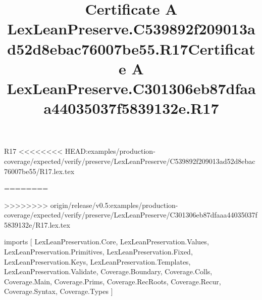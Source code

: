 \begin{lexlean}{R17}
<<<<<<<< HEAD:examples/production-coverage/expected/verify/preserve/LexLeanPreserve/C539892f209013ad52d8ebac76007be55/R17.lex.tex
\title{Certificate A LexLeanPreserve.C539892f209013ad52d8ebac76007be55.R17}
========
\title{Certificate A LexLeanPreserve.C301306eb87dfaaa44035037f5839132e.R17}
>>>>>>>> origin/release/v0.5:examples/production-coverage/expected/verify/preserve/LexLeanPreserve/C301306eb87dfaaa44035037f5839132e/R17.lex.tex
\begin{coremodule}
imports [
  LexLeanPreservation.Core,
  LexLeanPreservation.Values,
  LexLeanPreservation.Primitives,
  LexLeanPreservation.Fixed,
  LexLeanPreservation.Keys,
  LexLeanPreservation.Templates,
  LexLeanPreservation.Validate,
  Coverage.Boundary,
  Coverage.Colls,
  Coverage.Main,
  Coverage.Prims,
  Coverage.RecRoots,
  Coverage.Recur,
  Coverage.Syntax,
  Coverage.Types
]


\end{coremodule}
\end{lexlean}
